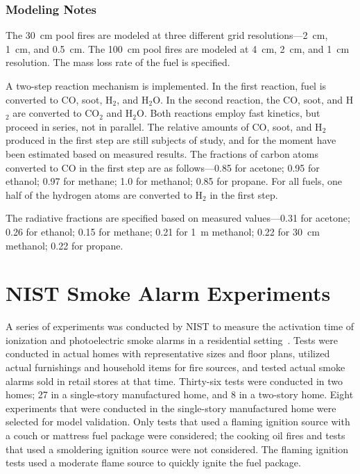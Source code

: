 \subsubsection{Modeling Notes}

The 30~cm pool fires are modeled at three different grid resolutions---2~cm, 1~cm, and 0.5~cm. The 100~cm pool fires are modeled at 4~cm, 2~cm, and 1~cm resolution. The mass loss rate of the fuel is specified.

A two-step reaction mechanism is implemented. In the first reaction, fuel is converted to CO, soot, H$_2$, and H$_2$O. In the second reaction, the CO, soot, and H$_2$ are converted to CO$_2$ and H$_2$O. Both reactions employ fast kinetics, but proceed in series, not in parallel. The relative amounts of CO, soot, and H$_2$ produced in the first step are still subjects of study, and for the moment have been estimated based on measured results. The fractions of carbon atoms converted to CO in the first step are as follows---0.85 for acetone; 0.95 for ethanol; 0.97 for methane; 1.0 for methanol; 0.85 for propane. For all fuels, one half of the hydrogen atoms are converted to H$_2$ in the first step.

The radiative fractions are specified based on measured values---0.31 for acetone; 0.26 for ethanol; 0.15 for methane; 0.21 for 1~m methanol; 0.22 for 30~cm methanol; 0.22 for propane.


\section{NIST Smoke Alarm Experiments}
\label{NIST_Smoke_Alarm_Description}

A series of experiments was conducted by NIST to measure the activation time of ionization and photoelectric smoke alarms in a residential setting~\cite{Bukowski:1}. Tests were conducted in actual homes with representative sizes and floor plans, utilized actual furnishings and household items for fire sources, and tested actual smoke alarms sold in retail stores at that time. Thirty-six tests were conducted in two homes; 27 in a single-story manufactured home, and 8 in a two-story home. Eight experiments that were conducted in the single-story manufactured home were selected for model validation. Only tests that used a flaming ignition source with a couch or mattress fuel package were considered; the cooking oil fires and tests that used a smoldering ignition source were not considered. The flaming ignition tests used a moderate flame source to quickly ignite the fuel package.

